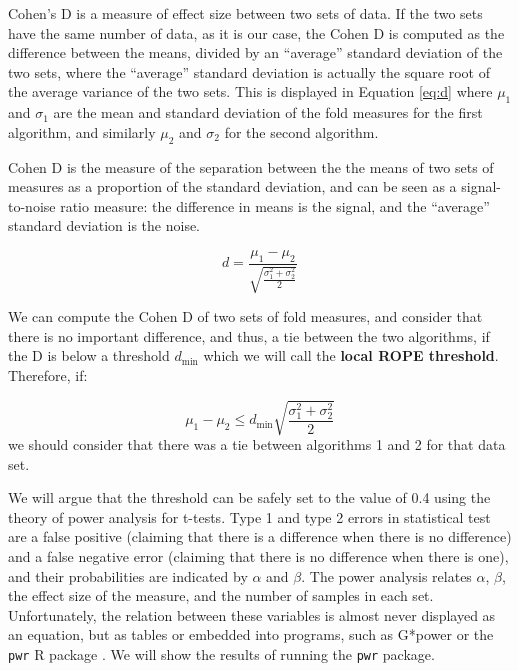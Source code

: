 \documentclass[twoside,11pt,preprint]{article}
\begin{document}
Cohen's D is a measure of effect size between two sets of data. If the two sets have the same number of data, as it is our
case, the Cohen D is computed as the difference between the means,
divided by an ``average'' standard deviation of the two sets, where the
``average'' standard deviation is actually the square root of the average
variance of the two sets. This is displayed in Equation \ref{eq:d} where \(\mu_1\) and \(\sigma_{1}\) are the mean and standard deviation of the fold measures for the first algorithm, and similarly \(\mu_2\) and \(\sigma_{2}\) for the second algorithm.

Cohen D is the measure of the separation between the the means of two sets of measures as a
proportion of the standard deviation, and can be seen as a signal-to-noise
ratio measure: the difference in means is the signal, and the
``average'' standard deviation is the noise.

\begin{equation} \label{eq:d}
d = \frac{\mu_1 - \mu_2}{\sqrt{\frac{\sigma_1^2 + \sigma_2^2}{2}}} 
\end{equation}

We can compute the Cohen D of two sets of fold measures, and consider
that there is no important difference, and thus, a tie between the two
algorithms, if the D is below a threshold \(d_{\min}\) which we will
call the \textbf{local ROPE threshold}. Therefore, if:

\begin{equation} \label{eq:dmin}
\mu_1 - \mu_2 \le d_{\min} \sqrt{\frac{\sigma_1^2 + \sigma_2^2}{2}} 
\end{equation}
we should consider that there was a tie between algorithms 1 and 2 for that data set.

We will argue that the threshold can be safely set to the value of 0.4
using the theory of power analysis for t-tests. Type 1 and type 2 errors in statistical test are a false positive (claiming that there is a difference when there is no difference) and a false negative error (claiming that there is no difference when there is one), and their probabilities are indicated by \(\alpha\) and \(\beta\).
The power analysis relates \(\alpha\), \(\beta\), the effect
size of the measure, and the number of samples in each set.
Unfortunately, the relation between these variables is almost never
displayed as an equation, but as tables \citep[ch.~2]{cohen1988statistical}
or embedded into programs, such as G*power \citep{faul2007g} or
the \texttt{pwr} R package \citep{pwrR}. We will show the results of running the
\texttt{pwr} package.
\end{document}
